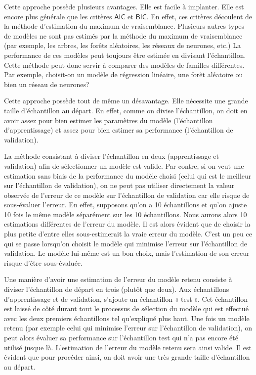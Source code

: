 \documentclass[
  11pt,
  letterpaper,
]{book}
\theoremstyle{definition}
\theoremstyle{definition}
\theoremstyle{definition}
\theoremstyle{remark}
\begin{document}
Cette approche possède plusieurs avantages. Elle est facile à implanter. Elle est encore plus générale que les critères \(\mathsf{AIC}\) et \(\mathsf{BIC}\). En effet, ces critères découlent de la méthode d'estimation du maximum de vraisemblance. Plusieurs autres types de modèles ne sont pas estimés par la méthode du maximum de vraisemblance (par exemple, les arbres, les forêts aléatoires, les réseaux de neurones, etc.) La performance de ces modèles peut toujours être estimée en divisant l'échantillon. Cette méthode peut donc servir à comparer des modèles de familles différentes. Par exemple, choisit-on un modèle de régression linéaire, une forêt aléatoire ou bien un réseau de neurones?

Cette approche possède tout de même un désavantage. Elle nécessite une grande taille d'échantillon au départ. En effet, comme on divise l'échantillon, on doit en avoir assez pour bien estimer les paramètres du modèle (l'échantillon d'apprentissage) et assez pour bien estimer sa performance (l'échantillon de validation).

La méthode consistant à diviser l'échantillon en deux (apprentissage et validation) afin de sélectionner un modèle est valide. Par contre, si on veut une estimation sans biais de la performance du modèle choisi (celui qui est le meilleur sur l'échantillon de validation), on ne peut pas utiliser directement la valeur observée de l'erreur de ce modèle sur l'échantillon de validation car elle risque de sous-évaluer l'erreur. En effet, supposons qu'on a 10 échantillons et qu'on ajuste 10 fois le même modèle séparément sur les 10 échantillons. Nous aurons alors 10 estimations différentes de l'erreur du modèle. Il est alors évident que de choisir la plus petite d'entre elles sous-estimerait la vraie erreur du modèle. C'est un peu ce qui se passe lorsqu'on choisit le modèle qui minimise l'erreur sur l'échantillon de validation. Le modèle lui-même est un bon choix, mais l'estimation de son erreur risque d'être sous-évaluée.

Une manière d'avoir une estimation de l'erreur du modèle retenu consiste à diviser l'échantillon de départ en trois (plutôt que deux). Aux échantillons d'apprentissage et de validation, s'ajoute un échantillon « test ». Cet échantillon est laissé de côté durant tout le processus de sélection du modèle qui est effectué avec les deux premiers échantillons tel qu'expliqué plus haut. Une fois un modèle retenu (par exemple celui qui minimise l'erreur sur l'échantillon de validation), on peut alors évaluer sa performance sur l'échantillon test qui n'a pas encore été utilisé jusque là. L'estimation de l'erreur du modèle retenu sera ainsi valide. Il est évident que pour procéder ainsi, on doit avoir une très grande taille d'échantillon au départ.
\end{document}
